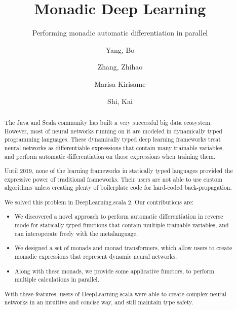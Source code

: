 \documentclass[acmsmall,10pt,review,screen,anonymous]{acmart}
\begin{document}
\title{Monadic Deep Learning}
\subtitle{Performing monadic automatic differentiation in parallel}

\author{Yang, Bo}
\author{Zhang, Zhihao}
\author{Marisa Kirisame} 
\author{Shi, Kai} 

\begin{abstract}
The Java and Scala community has built a very successful big data ecosystem.
However, most of neural networks running on it are modeled in dynamically typed programming languages.
These dynamically typed deep learning frameworks treat neural networks as differentiable expressions that contain many \glspl{trainable variable},
and perform automatic differentiation on those expressions when training them.

Until 2019, none of the learning frameworks in statically typed languages provided the expressive power of traditional frameworks.
Their users are not able to use custom algorithms unless creating plenty of boilerplate code for hard-coded back-propagation.

We solved this problem in DeepLearning.scala 2. Our contributions are:

\begin{itemize}
  \item We discovered a novel approach to perform automatic differentiation in reverse mode for statically typed functions that contain multiple \glspl{trainable variable}, and can interoperate freely with the metalanguage.
  \item We designed a set of monads and monad transformers, which allow users to create monadic expressions that represent dynamic neural networks.
  \item Along with these monads, we provide some applicative functors, to perform multiple calculations in parallel.
\end{itemize}

With these features, users of DeepLearning.scala were able to create complex neural networks in an intuitive and concise way, and still maintain type safety.
\end{abstract}
\end{document}
